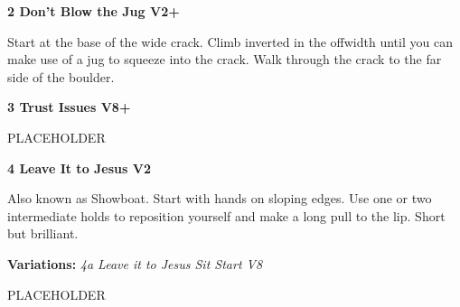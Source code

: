 \begin{multicols*}{2}
					\label{rt:Don't Blow the Jug}\colorbox{green!20}{\textbf{2 Don't Blow the Jug V2+ \ding{72}   \warn }}
					\begin{adjustwidth}{0.5cm}{}
					\begin{minipage}{\linewidth}					
					Start at the base of the wide crack. Climb inverted in the offwidth until you can make use of a jug to squeeze into the crack. Walk through the crack to the far side of the boulder.
					\end{minipage}
					\end{adjustwidth}
					\label{rt:Trust Issues}\colorbox{Goldenrod!50}{\textbf{3 Trust Issues V8+  \warn \warn }}
					\begin{adjustwidth}{0.5cm}{}
					\begin{minipage}{\linewidth}					
					PLACEHOLDER
					\end{minipage}
					\end{adjustwidth}
					\label{rt:Leave It to Jesus}\colorbox{green!20}{\textbf{4 Leave It to Jesus V2     }}
					\begin{adjustwidth}{0.5cm}{}
					\begin{minipage}{\linewidth}					
					Also known as Showboat. Start with hands on sloping edges. Use one or two intermediate holds to reposition yourself and make a long pull to the lip. Short but brilliant.
					\end{minipage}
						\newline \textbf{Variations:} \newline
							\label{vr:Leave it to Jesus Sit Start}\colorbox{Goldenrod!50}{\emph{4a Leave it to Jesus Sit Start V8  }}
							\begin{adjustwidth}{0.5cm}{}
							\begin{minipage}{\linewidth}					
							PLACEHOLDER
							\end{minipage}
							\end{adjustwidth}
					\end{adjustwidth}


\end{multicols*}

